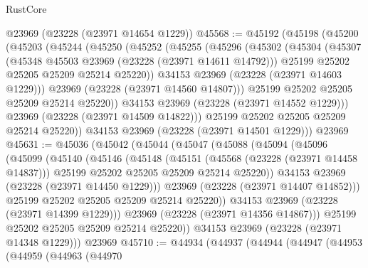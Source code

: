 \begin{lexlean}{RustCore}
\begin{coremodule}
    @23969
    (@23228 (@23971 @14654 @1229))
@45568 := @45192
    (@45198
      (@45200
        (@45203
          (@45244
            (@45250
              (@45252
                (@45255
                  (@45296
                    (@45302
                      (@45304
                        (@45307
                          (@45348 @45503 @23969 (@23228 (@23971 @14611 @14792)))
                          @25199
                          @25202
                          @25205
                          @25209
                          @25214
                          @25220))
                      @34153
                      @23969
                      (@23228 (@23971 @14603 @1229)))
                    @23969
                    (@23228 (@23971 @14560 @14807)))
                  @25199
                  @25202
                  @25205
                  @25209
                  @25214
                  @25220))
              @34153
              @23969
              (@23228 (@23971 @14552 @1229)))
            @23969
            (@23228 (@23971 @14509 @14822)))
          @25199
          @25202
          @25205
          @25209
          @25214
          @25220))
      @34153
      @23969
      (@23228 (@23971 @14501 @1229)))
    @23969
@45631 := @45036
    (@45042
      (@45044
        (@45047
          (@45088
            (@45094
              (@45096
                (@45099
                  (@45140
                    (@45146
                      (@45148
                        (@45151
                          (@45568 (@23228 (@23971 @14458 @14837)))
                          @25199
                          @25202
                          @25205
                          @25209
                          @25214
                          @25220))
                      @34153
                      @23969
                      (@23228 (@23971 @14450 @1229)))
                    @23969
                    (@23228 (@23971 @14407 @14852)))
                  @25199
                  @25202
                  @25205
                  @25209
                  @25214
                  @25220))
              @34153
              @23969
              (@23228 (@23971 @14399 @1229)))
            @23969
            (@23228 (@23971 @14356 @14867)))
          @25199
          @25202
          @25205
          @25209
          @25214
          @25220))
      @34153
      @23969
      (@23228 (@23971 @14348 @1229)))
    @23969
@45710 := @44934
    (@44937
      (@44944
        (@44947
          (@44953
            (@44959
              (@44963
                (@44970

\end{coremodule}
\end{lexlean}
